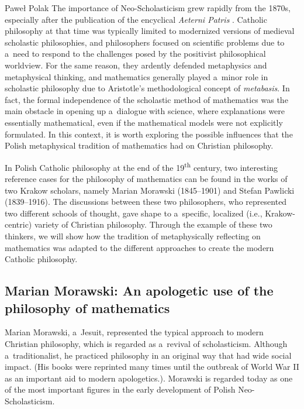 \begin{artengenv}{Paweł Polak}
The importance of Neo-Scholasticism grew rapidly from the 1870s, especially after the publication of the encyclical \textit{Aeterni Patris}
\parencite[][]{leo_xiii_aeterni_1879}. %
 Catholic philosophy at that time was typically limited to modernized versions of medieval scholastic philosophies, and philosophers focused on scientific problems due to a~need to respond to the challenges posed by the positivist philosophical worldview. For the same reason, they ardently defended metaphysics and metaphysical thinking, and mathematics generally played a~minor role in scholastic philosophy due to Aristotle's methodological concept of \textit{metabasis}. In fact, the formal independence of the scholastic method of mathematics was the main obstacle in opening up a~dialogue with science, where explanations were essentially mathematical, even if the mathematical models were not explicitly formulated. In this context, it is worth exploring the possible influences that the Polish metaphysical tradition of mathematics had on Christian philosophy.

In Polish Catholic philosophy at the end of the 19\textsuperscript{th} century, two interesting reference cases for the philosophy of mathematics can be found in the works of two Krakow scholars, namely Marian Morawski (1845–1901) and Stefan Pawlicki (1839--1916). The discussions between these two philosophers, who represented two different schools of thought, gave shape to a~specific, localized (i.e., Krakow-centric) variety of Christian philosophy. Through the example of these two thinkers, we will show how the tradition of metaphysically reflecting on mathematics was adapted to the different approaches to create the modern Catholic philosophy.

\subsection{Marian Morawski: An apologetic use of the philosophy of mathematics }

Marian Morawski, a~Jesuit, represented the typical approach to modern Christian philosophy, which is regarded as a~revival of scholasticism. Although a~traditionalist, he practiced philosophy in an original way that had wide social impact. (His books were reprinted many times until the outbreak of World War II as an important aid to modern apologetics.). Morawski is regarded today as one of the most important figures in the early development of Polish Neo-Scholasticism.


\end{artengenv}
